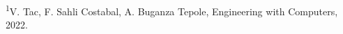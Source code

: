 \documentclass[preview]{standalone}
\begin{document}
\begin{center}
\textsuperscript{1}V. Tac, F. Sahli Costabal, A. Buganza Tepole, Engineering with Computers, 2022.
\end{center}
\end{document}
